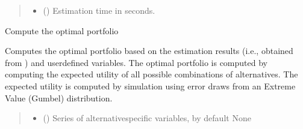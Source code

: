 \documentclass[a4paper,10pt,english]{sphinxhowto}
\begin{document}
\begin{fulllineitems}
\begin{fulllineitems}
\begin{quote}
\begin{description}
\begin{itemize}
\item {} 
\sphinxAtStartPar
{} () \textendash{} Estimation time in seconds.

\end{itemize}


\end{description}\end{quote}

\end{fulllineitems}


\begin{fulllineitems}
\label{\detokenize{generated/portchoice.models:portchoice.models.PortLogit.optimal_portfolio}}
\pysigstartsignatures
{}
\pysigstopsignatures
\sphinxAtStartPar
Compute the optimal portfolio

\sphinxAtStartPar
Computes the optimal portfolio based on the estimation results
(i.e., obtained from ) and user\sphinxhyphen{}defined variables.
The optimal portfolio is computed by computing the expected
utility of all possible combinations of alternatives. The
expected utility is computed by simulation using  error
draws from an Extreme Value (Gumbel) distribution.
\begin{quote}\begin{description}
\begin{itemize}
\item {} 
\sphinxAtStartPar
{} (\sphinxstyleliteralemphasis{\sphinxupquote{, }}) \textendash{} Series of alternative\sphinxhyphen{}specific variables, by default None


\end{itemize}
\end{description}
\end{quote}
\end{fulllineitems}
\end{fulllineitems}
\end{document}
